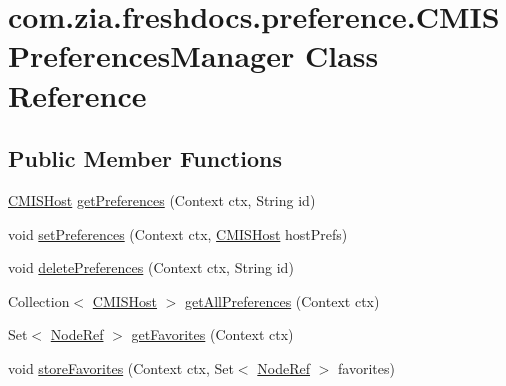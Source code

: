 \hypertarget{classcom_1_1zia_1_1freshdocs_1_1preference_1_1_c_m_i_s_preferences_manager}{\section{com.\-zia.\-freshdocs.\-preference.\-C\-M\-I\-S\-Preferences\-Manager Class Reference}
\label{classcom_1_1zia_1_1freshdocs_1_1preference_1_1_c_m_i_s_preferences_manager}
}
\subsection*{Public Member Functions}
\begin{DoxyCompactItemize}
\item 
\hyperlink{classcom_1_1zia_1_1freshdocs_1_1preference_1_1_c_m_i_s_host}{C\-M\-I\-S\-Host} \hyperlink{classcom_1_1zia_1_1freshdocs_1_1preference_1_1_c_m_i_s_preferences_manager_a3a67b7f241a8dc8b5213e36bf10d3153}{get\-Preferences} (Context ctx, String id)
\item 
void \hyperlink{classcom_1_1zia_1_1freshdocs_1_1preference_1_1_c_m_i_s_preferences_manager_a7d91a795bf5997b03ac482a1f2b732ce}{set\-Preferences} (Context ctx, \hyperlink{classcom_1_1zia_1_1freshdocs_1_1preference_1_1_c_m_i_s_host}{C\-M\-I\-S\-Host} host\-Prefs)
\item 
void \hyperlink{classcom_1_1zia_1_1freshdocs_1_1preference_1_1_c_m_i_s_preferences_manager_a8fefc173fde870e466c4f7ec2f5a5fd0}{delete\-Preferences} (Context ctx, String id)
\item 
Collection$<$ \hyperlink{classcom_1_1zia_1_1freshdocs_1_1preference_1_1_c_m_i_s_host}{C\-M\-I\-S\-Host} $>$ \hyperlink{classcom_1_1zia_1_1freshdocs_1_1preference_1_1_c_m_i_s_preferences_manager_a1262a8215772b41269af06eebe8253cb}{get\-All\-Preferences} (Context ctx)
\item 
Set$<$ \hyperlink{classcom_1_1zia_1_1freshdocs_1_1model_1_1_node_ref}{Node\-Ref} $>$ \hyperlink{classcom_1_1zia_1_1freshdocs_1_1preference_1_1_c_m_i_s_preferences_manager_a1ecfe957234bcb60dfb310e624c4d8de}{get\-Favorites} (Context ctx)
\item 
void \hyperlink{classcom_1_1zia_1_1freshdocs_1_1preference_1_1_c_m_i_s_preferences_manager_a66561a6bfa400e19d54ecf0a70fed1b9}{store\-Favorites} (Context ctx, Set$<$ \hyperlink{classcom_1_1zia_1_1freshdocs_1_1model_1_1_node_ref}{Node\-Ref} $>$ favorites)
\end{DoxyCompactItemize}
